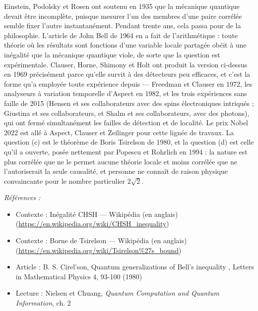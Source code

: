 \documentclass[11pt]{article}
\newenvironment{refs}{\par\small\noindent\emph{Références :}\begin{itemize}\setlength\itemsep{0pt}}{\end{itemize}\normalsize}
\begin{document}
\noindent Einstein, Podolsky et Rosen ont soutenu en 1935 que la mécanique quantique
devait être incomplète, puisque mesurer l'un des membres d'une paire corrélée semble fixer l'autre
instantanément. Pendant trente ans, cela passa pour de la philosophie. L'article de John Bell de
1964 en a fait de l'arithmétique : toute théorie où les résultats sont fonctions d'une variable
locale partagée obéit à une inégalité que la mécanique quantique viole, de sorte que la question
est expérimentale. Clauser, Horne, Shimony et Holt ont produit la version ci-dessus en 1969
précisément parce qu'elle survit à des détecteurs peu efficaces, et c'est la forme qu'a employée
toute expérience depuis --- Freedman et Clauser en 1972, les analyseurs à variation temporelle
d'Aspect en 1982, et les trois expériences sans faille de 2015 (Hensen et ses collaborateurs avec
des spins électroniques intriqués ; Giustina et ses collaborateurs, et Shalm et ses
collaborateurs, avec des photons), qui ont fermé simultanément les failles de détection et de
localité. Le prix Nobel 2022 est allé à Aspect, Clauser et Zeilinger pour cette lignée de travaux.
La question (c) est le théorème de Boris Tsirelson de 1980, et la question (d) est celle qu'il a
ouverte, posée nettement par Popescu et Rohrlich en 1994 : la nature est plus corrélée que ne le
permet aucune théorie locale et moins corrélée que ne l'autoriserait la seule causalité, et
personne ne connaît de raison physique convaincante pour le nombre particulier
$2\sqrt{2}$.

\begin{refs}
\item Contexte : Inégalité CHSH --- Wikipédia (en anglais) (\url{https://en.wikipedia.org/wiki/CHSH_inequality})
\item Contexte : Borne de Tsirelson --- Wikipédia (en anglais) (\url{https://en.wikipedia.org/wiki/Tsirelson%27s_bound})
\item Article : B. S. Cirel'son, \og{} Quantum generalizations of Bell's inequality \fg{}, Letters in Mathematical Physics 4, 93-100 (1980)
\item Lecture : Nielsen et Chuang, \textit{Quantum Computation and Quantum Information}, ch. 2
\end{refs}

\bigskip
\end{document}
